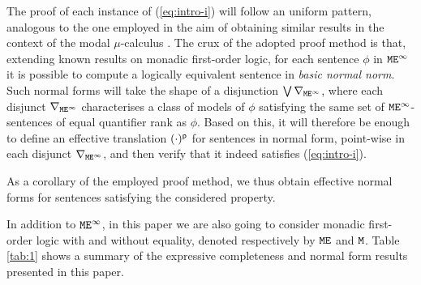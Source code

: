 The proof of each instance of (\ref{eq:intro-i})  will follow an uniform 
pattern, analogous to the one employed in the aim of obtaining similar results
in the context of the modal $\mu$-calculus \cite{Jan96,d2000logical,FV12}.
The crux of the adopted proof method is that, extending known results on monadic
first-order logic, for each sentence $\phi$ in $ \mathtt{M}\mathtt{E}^{\infty}$ it is possible to compute
a logically equivalent sentence in \emph{basic normal norm}. 
Such normal forms will take the shape of a disjunction $\bigvee \nabla_{\mathtt{M}\mathtt{E}^{\infty}}$, 
where each disjunct $\nabla_{\mathtt{M}\mathtt{E}^{\infty}}$ characterises a class of models of $\phi$
satisfying the same set of ${\mathtt{M}\mathtt{E}^{\infty}}$-sentences of equal quantifier rank as 
$\phi$. 
Based on this, it will therefore be enough to define an effective translation
$(\cdot)^{\sf p}$ for sentences in normal form, point-wise in each disjunct 
$\nabla_{\mathtt{M}\mathtt{E}^{\infty}}$, and  then verify that it indeed satisfies (\ref{eq:intro-i}). 

As a corollary of the employed proof method, we thus obtain effective normal
forms for sentences satisfying the considered property.

In addition to $\mathtt{M}\mathtt{E}^{\infty}$, in this paper we are also going to consider monadic 
first-order logic with and without equality, denoted respectively by $\mathtt{M}\mathtt{E}$ 
and $\mathtt{M}$.
Table \ref{tab:1} shows a summary of the expressive completeness and normal 
form results presented in this paper. 


